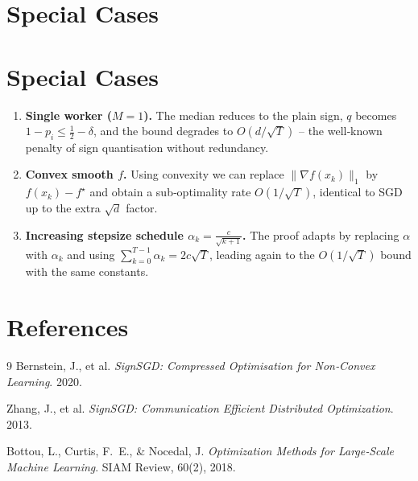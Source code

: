 \documentclass{article}
\begin{document}
\section*{Special Cases}
\section{Special Cases}
\begin{enumerate}
\item \textbf{Single worker ($M=1$).}
    The median reduces to the plain sign, $q$ becomes
    $1-p_i\le \tfrac12-\delta$, and the bound degrades to
    $O(d/\sqrt{T})$ – the well‑known penalty of sign quantisation
    without redundancy.
\item \textbf{Convex smooth $f$.}
    Using convexity we can replace $\|\nabla f(x_k)\|_{1}$ by
    $f(x_k)-f^{\star}$ and obtain a sub‑optimality rate
    $O(1/\sqrt{T})$, identical to SGD up to the extra $\sqrt{d}$ factor.
\item \textbf{Increasing stepsize schedule $\alpha_k=\frac{c}{\sqrt{k+1}}$.}
    The proof adapts by replacing $\alpha$ with $\alpha_k$ and using
    $\sum_{k=0}^{T-1}\alpha_k = 2c\sqrt{T}$, leading again to the
    $O(1/\sqrt{T})$ bound with the same constants.
\end{enumerate}

\section*{References}
\begin{thebibliography}{9}
  Bernstein, J., et al. \emph{SignSGD: Compressed Optimisation for
  Non‑Convex Learning}. 2020.

  Zhang, J., et al. \emph{SignSGD: Communication Efficient Distributed
  Optimization}. 2013.

  Bottou, L., Curtis, F.~E., \& Nocedal, J.
  \emph{Optimization Methods for Large‑Scale Machine Learning}.
  SIAM Review, 60(2), 2018.
\end{thebibliography}
\end{document}
